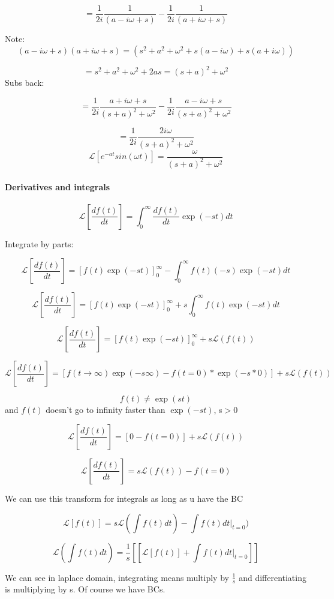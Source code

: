 \documentclass[17pt]{extarticle}
\begin{document}
$$ = \frac{1}{2i}  \frac{1}{(a- i \omega+s)} -\frac{1}{2i}  \frac{1}{(a+ i \omega+s)} $$

Note:
$$(a- i\omega +s)(a +i \omega +s) = (s^2 +a^2 + \omega^2 +s(a-i \omega) +s (a + i \omega) ) $$

$$= s^2 + a^2 + \omega^2 + 2as = (s+a)^2 + \omega^2$$
Subs back:


$$ = \frac{1}{2i}  \frac{a+i \omega + s}{(s+a)^2 + \omega^2} -\frac{1}{2i}  \frac{a- i \omega + s}{(s+a)^2 + \omega^2} $$

$$ = \frac{1}{2i}  \frac{2 i \omega}{(s+a)^2 + \omega^2} $$
$$ \mathcal{L} \left[ e^{-a t}  sin (\omega t) \right] =  \frac{ \omega}{(s+a)^2 + \omega^2} $$

\paragraph{Derivatives and integrals}

$$\mathcal{L} [ \frac{df(t)}{dt}] = \int_0^\infty \frac{d f(t)}{dt} \exp(-st) dt $$

Integrate by parts:

$$\mathcal{L} [ \frac{df(t)}{dt}] = [f(t) \exp(-st)]_0^\infty - \int_0^\infty f(t) (-s) \exp(-st) dt$$

$$\mathcal{L} [ \frac{df(t)}{dt}] = [f(t) \exp(-st)]_0^\infty +s \int_0^\infty f(t)  \exp(-st) dt$$

$$\mathcal{L} [ \frac{df(t)}{dt}] = [f(t) \exp(-st)]_0^\infty +s \mathcal{L} (f(t))$$

$$\mathcal{L} [ \frac{df(t)}{dt}] = [f(t \rightarrow \infty) \exp(-s\infty) - f(t = 0) * \exp(-s*0) ] +s \mathcal{L} (f(t))$$

$$f(t) \neq \exp(st)$$
and $f(t)$ doesn't go to infinity faster than $\exp(-st)$, s$>$0

$$\mathcal{L} [ \frac{df(t)}{dt}] = [0 - f(t = 0) ] +s \mathcal{L} (f(t))$$

$$\mathcal{L} [ \frac{df(t)}{dt}] = s \mathcal{L} (f(t)) - f(t = 0) $$

We can use this transform for integrals as long as u have the BC

$$\mathcal{L} [ f(t)] = s \mathcal{L} (\int f(t) dt) -\int f (t) dt|_{t = 0} )  $$

$$ \mathcal{L} (\int f(t) dt) = \frac{1}{s} \left[ [\mathcal{L} [ f(t)] + \int f (t) dt|_{t = 0} ]  \right]$$


We can see in laplace domain, integrating means multiply by $\frac{1}{s}$ and differentiating is multiplying by s. Of course we have BCs.
\end{document}

